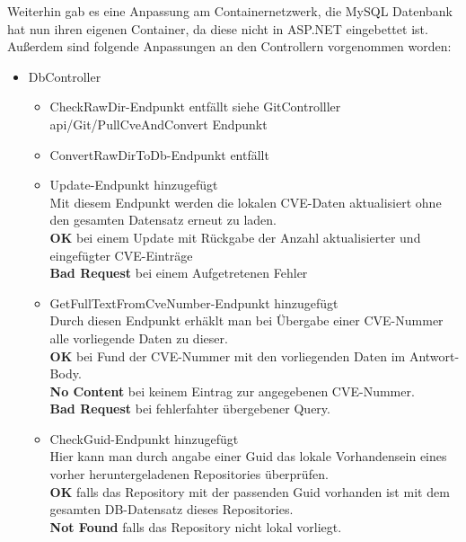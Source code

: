     Weiterhin gab es eine Anpassung am Containernetzwerk, die MySQL Datenbank hat nun ihren eigenen Container, da diese nicht in ASP.NET eingebettet ist.
    Außerdem sind folgende Anpassungen an den Controllern vorgenommen worden:
    \begin{itemize}
        \item DbController \label{api_controller:three}
            \begin{itemize}
                \item CheckRawDir-Endpunkt entfällt siehe GitControlller api/Git/PullCveAndConvert Endpunkt
                \item ConvertRawDirToDb-Endpunkt entfällt
                \item Update-Endpunkt hinzugefügt \\
                    Mit diesem Endpunkt werden die lokalen CVE-Daten aktualisiert ohne den gesamten Datensatz erneut zu laden.
                    \\
                    \textbf{OK} bei einem Update mit Rückgabe der Anzahl aktualisierter und eingefügter CVE-Einträge
                    \\
                    \textbf{Bad Request} bei einem Aufgetretenen Fehler
                \item GetFullTextFromCveNumber-Endpunkt hinzugefügt \\
                    Durch diesen Endpunkt erhäklt man bei Übergabe einer CVE-Nummer alle vorliegende Daten zu dieser.
                    \\
                    \textbf{OK} bei Fund der CVE-Nummer mit den vorliegenden Daten im Antwort-Body.
                    \\
                    \textbf{No Content} bei keinem Eintrag zur angegebenen CVE-Nummer. 
                    \\
                    \textbf{Bad Request} bei fehlerfahter übergebener Query.
                \item CheckGuid-Endpunkt hinzugefügt \\
                    Hier kann man durch angabe einer Guid das lokale Vorhandensein eines vorher heruntergeladenen Repositories überprüfen.
                    \\
                    \textbf{OK} falls das Repository mit der passenden Guid vorhanden ist mit dem gesamten DB-Datensatz dieses Repositories.
                    \\
                    \textbf{Not Found} falls das Repository nicht lokal vorliegt.
            \end{itemize}


\end{itemize}
